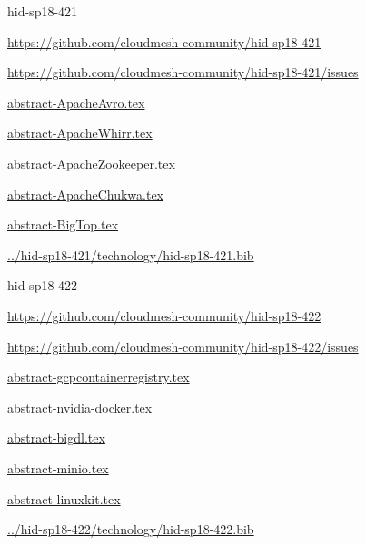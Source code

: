 \begin{IU}

hid-sp18-421

\url{https://github.com/cloudmesh-community/hid-sp18-421}

\url{https://github.com/cloudmesh-community/hid-sp18-421/issues}

\href{https://github.com/cloudmesh-community/hid-sp18-421/blob/master//technology/abstract-ApacheAvro.tex}{abstract-ApacheAvro.tex}

\href{https://github.com/cloudmesh-community/hid-sp18-421/blob/master//technology/abstract-ApacheWhirr.tex}{abstract-ApacheWhirr.tex}

\href{https://github.com/cloudmesh-community/hid-sp18-421/blob/master//technology/abstract-ApacheZookeeper.tex}{abstract-ApacheZookeeper.tex}

\href{https://github.com/cloudmesh-community/hid-sp18-421/blob/master//technology/abstract-ApacheChukwa.tex}{abstract-ApacheChukwa.tex}

\href{https://github.com/cloudmesh-community/hid-sp18-421/blob/master//technology/abstract-BigTop.tex}{abstract-BigTop.tex}

\href{https://github.com/cloudmesh-community/hid-sp18-421/blob/master//technology/hid-sp18-421.bib}{../hid-sp18-421/technology/hid-sp18-421.bib}

\end{IU}


\begin{IU}

hid-sp18-422

\url{https://github.com/cloudmesh-community/hid-sp18-422}

\url{https://github.com/cloudmesh-community/hid-sp18-422/issues}

\href{https://github.com/cloudmesh-community/hid-sp18-422/blob/master//technology/abstract-gcpcontainerregistry.tex}{abstract-gcpcontainerregistry.tex}

\href{https://github.com/cloudmesh-community/hid-sp18-422/blob/master//technology/abstract-nvidia-docker.tex}{abstract-nvidia-docker.tex}

\href{https://github.com/cloudmesh-community/hid-sp18-422/blob/master//technology/abstract-bigdl.tex}{abstract-bigdl.tex}

\href{https://github.com/cloudmesh-community/hid-sp18-422/blob/master//technology/abstract-minio.tex}{abstract-minio.tex}

\href{https://github.com/cloudmesh-community/hid-sp18-422/blob/master//technology/abstract-linuxkit.tex}{abstract-linuxkit.tex}

\href{https://github.com/cloudmesh-community/hid-sp18-422/blob/master//technology/hid-sp18-422.bib}{../hid-sp18-422/technology/hid-sp18-422.bib}

\end{IU}


